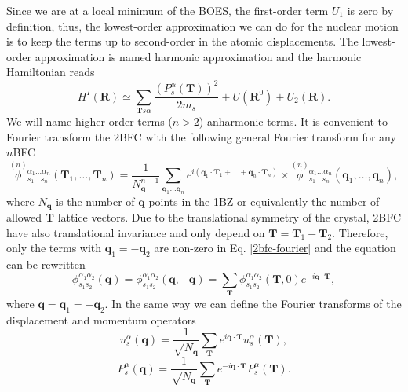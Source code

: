 Since we are at a local minimum of the BOES, the first-order term $U_{1}$ is zero by definition, thus, the lowest-order approximation we can do for the nuclear motion is to keep the terms up to second-order in the atomic 
displacements. The lowest-order approximation is named harmonic approximation and the harmonic Hamiltonian reads
\begin{equation}
 H^{I}(\mathbf{R})\simeq\sum_{\mathbf{T}s\alpha}\frac{(P_{s}^{\alpha}(\mathbf{T}))^{2}}{2m_{s}}+U(\mathbf{R}^{0})+U_{2}(\mathbf{R}).
\end{equation}
We will name higher-order terms ($n>2$) anharmonic terms. It is convenient to Fourier transform the 2BFC  with the following general Fourier transform for any $n$BFC
\begin{equation}
 \label{2bfc-fourier}
 \overset{(n)}{\phi}{}_{s_{1}\dots s_{n}}^{\alpha_{1}\dots\alpha_{n}}(\mathbf{T}_{1},\dots,\mathbf{T}_{n})=\frac{1}{N_{\mathbf{q}}^{n-1}}\sum_{\mathbf{q}_{1}\dots\mathbf{q}_{n}}e^{i(\mathbf{q}_{1}\cdot\mathbf{T}_{1}+\dots+\mathbf{q}_{
 n}\cdot\mathbf{T}_{n})}\times\overset{(n)}{\phi}{}_{s_{1}\dots s_{n}}^{\alpha_{1}\dots\alpha_{n}}(\mathbf{q}_{1},\dots,\mathbf{q}_{n}),
\end{equation}
where $N_{\mathbf{q}}$ is the number of $\mathbf{q}$ points in the 1BZ or equivalently the number of allowed $\mathbf{T}$ lattice vectors. Due to the translational symmetry of the crystal, 2BFC have also translational invariance and only 
depend on $\mathbf{T}=\mathbf{T}_{1}-\mathbf{T}_{2}$. Therefore, only the terms with $\mathbf{q}_{1}=-\mathbf{q}_{2}$ are non-zero in 
Eq. \ref{2bfc-fourier} and the equation can be rewritten
\begin{equation}
 \label{2bfc-fourier-simple}
 \phi_{s_{1}s_{2}}^{\alpha_{1}\alpha_{2}}(\mathbf{q})=\phi_{s_{1}s_{2}}^{\alpha_{1}\alpha_{2}}(\mathbf{q},-\mathbf{q})=\sum_{\mathbf{T}}\phi_{s_{1}s_{2}}^{\alpha_{1}\alpha_{2}}(\mathbf{T},0)e^{-i\mathbf{
 q}\cdot\mathbf{T}},
\end{equation} 
where $\mathbf{q}=\mathbf{q}_{1}=-\mathbf{q}_{2}$. In the same way we can define the Fourier transforms of the displacement and momentum operators
\begin{equation}
 \label{displacement-fourier}
 u_{s}^{\alpha}(\mathbf{q})=\frac{1}{\sqrt{N_{\mathbf{q}}}}\sum_{\mathbf{T}}e^{i\mathbf{q}\cdot\mathbf{T}}u_{s}^{\alpha}(\mathbf{T}),
\end{equation}
\begin{equation}
 \label{momentum-fourier}
 P_{s}^{\alpha}(\mathbf{q})=\frac{1}{\sqrt{N_{\mathbf{q}}}}\sum_{\mathbf{T}}e^{-i\mathbf{q}\cdot\mathbf{T}}P_{s}^{\alpha}(\mathbf{T}).
\end{equation}
